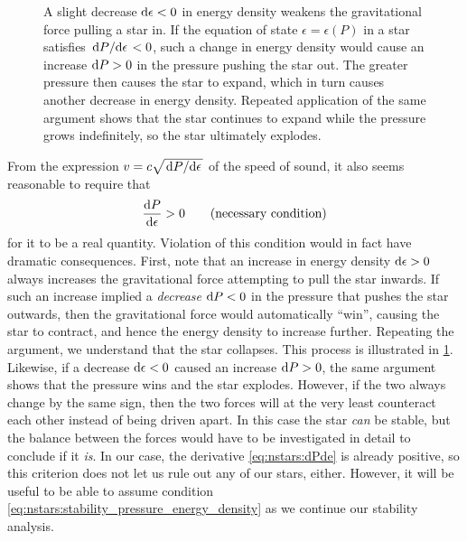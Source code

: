 \begin{figure}
\caption{\label{fig:nstars:star_explosion}%
A slight decrease $\mathop{}\!\mathrm{d} \epsilon < 0$ in energy density weakens the gravitational force pulling a star in.
If the equation of state $\epsilon = \epsilon(P)$ in a star satisfies $\odv{P}/{\epsilon} < 0$, such a change in energy density would cause an increase $\mathop{}\!\mathrm{d} P > 0$ in the pressure pushing the star out.
The greater pressure then causes the star to expand, which in turn causes another decrease in energy density.
Repeated application of the same argument shows that the star continues to expand while the pressure grows indefinitely, so the star ultimately explodes.
}
\end{figure}

From the expression $v = c \sqrt{\odv{P}/{\epsilon}}$ of the speed of sound, it also seems reasonable to require that
\begin{equation}
	\odv{P}{\epsilon} > 0
	\qquad \text{(necessary condition)}
\label{eq:nstars:stability_pressure_energy_density}
\end{equation}
for it to be a real quantity.
Violation of this condition would in fact have dramatic consequences.
First, note that an increase in energy density $\mathop{}\!\mathrm{d} \epsilon > 0$ always increases the gravitational force attempting to pull the star inwards.
If such an increase implied a \emph{decrease} $\mathop{}\!\mathrm{d} P < 0$ in the pressure that pushes the star outwards, then the gravitational force would automatically ``win'', causing the star to contract, and hence the energy density to increase further.
Repeating the argument, we understand that the star collapses. 
This process is illustrated in \cref{fig:nstars:star_explosion}.
Likewise, if a decrease $\mathop{}\!\mathrm{d} \epsilon < 0$ caused an increase $\mathop{}\!\mathrm{d} P > 0$, the same argument shows that the pressure wins and the star explodes.
However, if the two always change by the same sign, then the two forces will at the very least counteract each other instead of being driven apart. 
In this case the star \emph{can} be stable, but the balance between the forces would have to be investigated in detail to conclude if it \emph{is}.
In our case, the derivative \eqref{eq:nstars:dPde} is already positive, so this criterion does not let us rule out any of our stars, either.
However, it will be useful to be able to assume condition \eqref{eq:nstars:stability_pressure_energy_density} as we continue our stability analysis.

